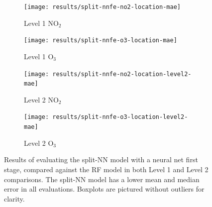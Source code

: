 \documentclass[journal abbreviation, manuscript]{copernicus}
\newcommand\todo[1]{\textcolor{red}{#1}}
\newcommand{\textus}[1]{$_{\text{#1}}$}
\begin{document}

\begin{figure}[H]
\centering
\begin{subfigure}{0.45\textwidth}
\texttt{[image: results/split-nnfe-no2-location-mae]}
\caption{Level 1 NO\textus{2}}
\end{subfigure}
\begin{subfigure}{0.45\textwidth}
\texttt{[image: results/split-nnfe-o3-location-mae]}
\caption{Level 1 O\textus{3}}
\end{subfigure}
\begin{subfigure}{0.45\textwidth}
\texttt{[image: results/split-nnfe-no2-location-level2-mae]}
\caption{Level 2 NO\textus{2}}
\end{subfigure}
\begin{subfigure}{0.45\textwidth}
\texttt{[image: results/split-nnfe-o3-location-level2-mae]}
\caption{Level 2 O\textus{3}}
\end{subfigure}
\caption{Results of evaluating the split-NN model with a neural net first stage, compared against the RF model in both Level 1 and Level 2 comparisons. The split-NN model has a lower mean and median error in all evaluations. Boxplots are pictured without outliers for clarity.}
\label{fig:split-results-nnfe}
\end{figure}

\end{document}
